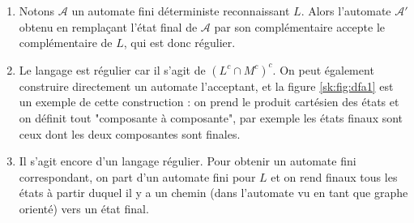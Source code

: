 \begin{sol}
\begin{enumerate}
\item Notons $\mathcal{A}$ un automate fini déterministe reconnaissant $L$. Alors l'automate $\mathcal{A'}$ obtenu en remplaçant l'état final de $\mathcal{A}$ par son complémentaire accepte le complémentaire de $L$, qui est donc régulier.
\item Le langage est régulier car il s'agit de $(L^c\cap M^c)^c$. On peut également construire directement un automate l'acceptant, et la figure \ref{sk:fig:dfa1} est un exemple de cette construction : on prend le produit cartésien des états et on définit tout "composante à composante", par exemple les états finaux sont ceux dont les deux composantes sont finales.
\item Il s'agit encore d'un langage régulier. Pour obtenir un automate fini correspondant, on part d'un automate fini pour $L$ et on rend finaux tous les états à partir duquel il y a un chemin (dans l'automate vu en tant que graphe orienté) vers un état final.
\end{enumerate}
\end{sol}


